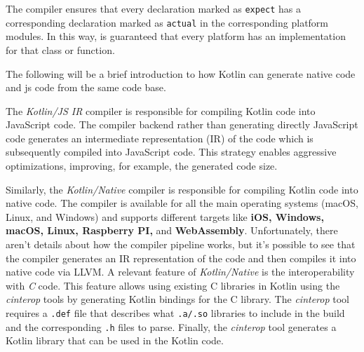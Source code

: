 The compiler ensures that every declaration marked as \texttt{expect} has a corresponding declaration marked as \texttt{actual} in the corresponding
platform modules. In this way, is guaranteed that every platform has an implementation for that class or function.

The following will be a brief introduction to how Kotlin can generate native code and js code from the same code base.

The \emph{Kotlin/JS IR} compiler is responsible for compiling Kotlin code into JavaScript code. The compiler backend rather than generating directly
JavaScript code generates an intermediate representation (IR) of the code which is subsequently compiled into JavaScript code.
This strategy enables aggressive optimizations, improving, for example, the generated code size.

Similarly, the \emph{Kotlin/Native} compiler is responsible for compiling Kotlin code into native code. The compiler is available for all the main
operating systems (macOS, Linux, and Windows) and supports different targets like \textbf{iOS, Windows, macOS, Linux, Raspberry PI,} and
\textbf{WebAssembly}. Unfortunately, there aren't details about how the compiler pipeline works, but it's possible to see that the compiler generates
an IR representation of the code and then compiles it into native code via LLVM.
A relevant feature of \emph{Kotlin/Native} is the interoperability with \emph{C} code. This feature allows using existing C libraries in Kotlin using
the \emph{cinterop} tools by generating Kotlin bindings for the C library. The \emph{cinterop} tool requires a \texttt{.def} file that describes what
\texttt{.a/.so} libraries to include in the build and the corresponding \texttt{.h} files to parse. Finally, the \emph{cinterop} tool generates a
Kotlin library that can be used in the Kotlin code.

